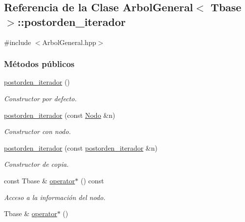\hypertarget{classArbolGeneral_1_1postorden__iterador}{\subsection{Referencia de la Clase Arbol\-General$<$ Tbase $>$\-:\-:postorden\-\_\-iterador}
\label{classArbolGeneral_1_1postorden__iterador}
}


{\ttfamily \#include $<$Arbol\-General.\-hpp$>$}

\subsubsection*{Métodos públicos}
\begin{DoxyCompactItemize}
\item 
\hyperlink{classArbolGeneral_1_1postorden__iterador_a2ac2dbbaf71087cf7d5964b45b4bca1e}{postorden\-\_\-iterador} ()
\begin{DoxyCompactList}\small\item\em Constructor por defecto. \end{DoxyCompactList}\item 
\hyperlink{classArbolGeneral_1_1postorden__iterador_a40c1929529a5d1063e97c07a73ecb043}{postorden\-\_\-iterador} (const \hyperlink{classArbolGeneral_a12cc1b74a9095d89bc7334290d332f7a}{Nodo} \&n)
\begin{DoxyCompactList}\small\item\em Constructor con nodo. \end{DoxyCompactList}\item 
\hyperlink{classArbolGeneral_1_1postorden__iterador_a07bc1d0276eb14be207144f0a69745d3}{postorden\-\_\-iterador} (const \hyperlink{classArbolGeneral_1_1postorden__iterador}{postorden\-\_\-iterador} \&n)
\begin{DoxyCompactList}\small\item\em Constructor de copia. \end{DoxyCompactList}\item 
const Tbase \& \hyperlink{classArbolGeneral_1_1postorden__iterador_a7416472d2c6f1ecf02262e79887f38ee}{operator$\ast$} () const 
\begin{DoxyCompactList}\small\item\em Acceso a la información del nodo. \end{DoxyCompactList}\item 
Tbase \& \hyperlink{classArbolGeneral_1_1postorden__iterador_af0f0fcc363dd30b5b0d102c1b60817c3}{operator$\ast$} ()

\end{DoxyCompactItemize}
